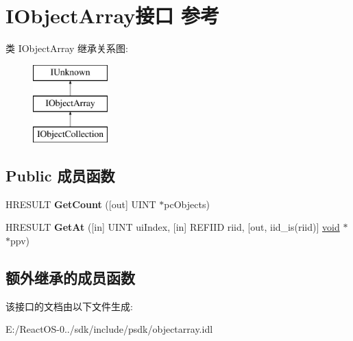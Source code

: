 \hypertarget{interface_i_object_array}{}\section{I\+Object\+Array接口 参考}
\label{interface_i_object_array}
类 I\+Object\+Array 继承关系图\+:\begin{figure}[H]
\begin{center}
\leavevmode
\includegraphics[height=3.000000cm]{interface_i_object_array}
\end{center}
\end{figure}
\subsection*{Public 成员函数}
\begin{DoxyCompactItemize}
\item 
\mbox{\label{interface_i_object_array_a41e3edd72d6b61c872a80b6f2edfb0cc}} 
H\+R\+E\+S\+U\+LT {\bfseries Get\+Count} (\mbox{[}out\mbox{]} U\+I\+NT $\ast$pc\+Objects)
\item 
\mbox{\label{interface_i_object_array_aef8645bbc81bf8beacc0c6d078058d13}} 
H\+R\+E\+S\+U\+LT {\bfseries Get\+At} (\mbox{[}in\mbox{]} U\+I\+NT ui\+Index, \mbox{[}in\mbox{]} R\+E\+F\+I\+ID riid, \mbox{[}out, iid\+\_\+is(riid)\mbox{]} \hyperlink{interfacevoid}{void} $\ast$$\ast$ppv)
\end{DoxyCompactItemize}
\subsection*{额外继承的成员函数}


该接口的文档由以下文件生成\+:\begin{DoxyCompactItemize}
\item 
E\+:/\+React\+O\+S-\/0../sdk/include/psdk/objectarray.\+idl\end{DoxyCompactItemize}
